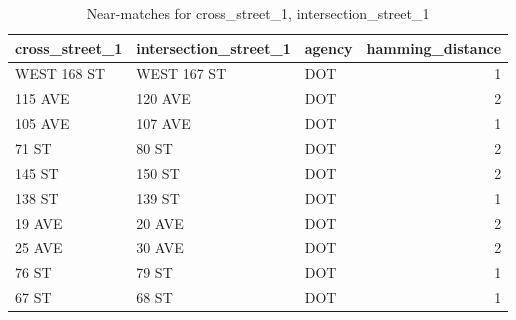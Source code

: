 \documentclass[12pt, titlepage]{article}
\begin{document}
\begin{table}[tbp]
    \centering
     \caption{Near-matches for cross\_street\_1, intersection\_street\_1}
     \label{tab:x1nearmatches}
		\begin{tabular}{l l l r}
	        \toprule
	        \textbf{cross\_street\_1} & \textbf{intersection\_street\_1} 
	        & \textbf{agency} & \textbf{hamming\_distance} \\
	        \midrule
	        WEST 168 ST    & WEST 167 ST           & DOT    & 1 \\
	        115 AVE        & 120 AVE               & DOT    & 2 \\
	        105 AVE        & 107 AVE               & DOT    & 1 \\
	        71 ST          & 80 ST                 & DOT    & 2 \\
	        145 ST         & 150 ST                & DOT    & 2 \\
	        138 ST         & 139 ST                & DOT    & 1 \\
	        19 AVE         & 20 AVE                & DOT    & 2 \\
	        25 AVE         & 30 AVE                & DOT    & 2 \\
	        76 ST          & 79 ST                 & DOT    & 1 \\
	        67 ST          & 68 ST                 & DOT    & 1 \\
	        \bottomrule
	    \end{tabular}
\end{table}
\end{document}
